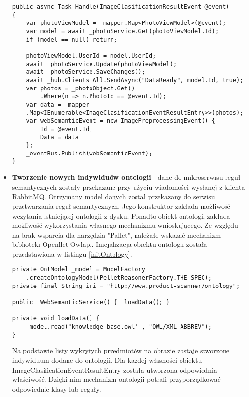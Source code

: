 \begin{itemize}
\begin{lstlisting}[caption={Przekazanie danych do aplikacji mobilnej oraz mikroserwisu reguł semantycznych.}]
public async Task Handle(ImageClasificationResultEvent @event)
{
	var photoViewModel = _mapper.Map<PhotoViewModel>(@event);
	var model = await _photoService.Get(photoViewModel.Id);
	if (model == null) return;
	
	photoViewModel.UserId = model.UserId;
	await _photoService.Update(photoViewModel);
	await _photoService.SaveChanges();
	await _hub.Clients.All.SendAsync("DataReady", model.Id, true);
	var photos = _photoObject.Get()
		.Where(n => n.PhotoId == @event.Id);
	var data = _mapper
	.Map<IEnumerable<ImageClasificationEventResultEntry>>(photos);
	var webSemanticEvent = new ImagePreprocessingEvent() {
		Id = @event.Id,
		Data = data
	};	
	_eventBus.Publish(webSemanticEvent);
}
\end{lstlisting}

\item \textbf{Tworzenie nowych indywiduów ontologii} - dane do mikroserwisu reguł semantycznych zostały przekazane przy użyciu wiadomości wysłanej z klienta RabbitMQ. Otrzymany model danych został przekazany do serwisu przetwarzania reguł semantycznych. Jego konstruktor zakłada możliwość wczytania istniejącej ontologii z dysku. Ponadto obiekt ontologii zakłada możliwość wykorzystania własnego mechanizmu wnioskującego. Ze względu na brak wsparcia dla narzędzia "Pallet", należało wskazać mechanizm biblioteki Openllet Owlapi. Inicjalizacja obiektu ontologii została przedstawiona w listingu \ref{initOntology}.
\newpage

\begin{lstlisting}[caption={Stworzenie instancji modelu ontologii.}, label={initOntology}]
private OntModel _model = ModelFactory
	.createOntologyModel(PelletReasonerFactory.THE_SPEC);
private final String iri = "http://www.product-scanner/ontology";

public  WebSemanticService() {	loadData(); }

private void loadData() {
	_model.read("knowledge-base.owl" , "OWL/XML-ABBREV");
}

\end{lstlisting}
Na podstawie listy wykrytych przedmiotów na obrazie zostaje stworzone indywiduum dodane do ontologii. Dla każdej własności obiektu ImageClasificationEventResultEntry została utworzona odpowiednia właściwość. Dzięki nim mechanizm ontologii potrafi przyporządkować odpowiednie klasy lub reguły.
\begin{lstlisting}[caption={Dodanie danych do ontologii.}]


\end{lstlisting}
\end{itemize}
